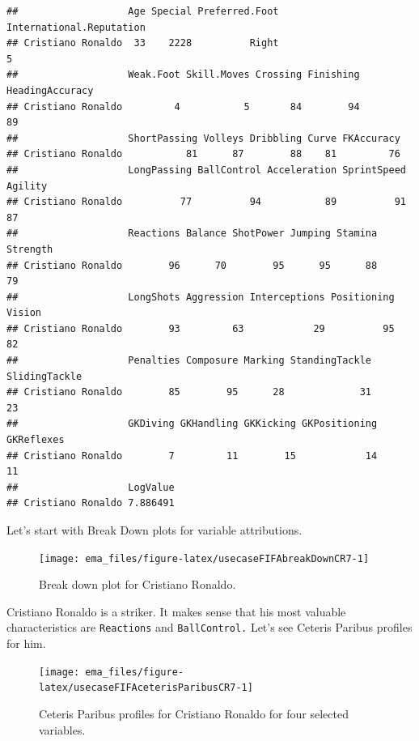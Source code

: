 \documentclass[]{krantz}
\begin{document}
\begin{verbatim}
##                   Age Special Preferred.Foot International.Reputation
## Cristiano Ronaldo  33    2228          Right                        5
##                   Weak.Foot Skill.Moves Crossing Finishing HeadingAccuracy
## Cristiano Ronaldo         4           5       84        94              89
##                   ShortPassing Volleys Dribbling Curve FKAccuracy
## Cristiano Ronaldo           81      87        88    81         76
##                   LongPassing BallControl Acceleration SprintSpeed Agility
## Cristiano Ronaldo          77          94           89          91      87
##                   Reactions Balance ShotPower Jumping Stamina Strength
## Cristiano Ronaldo        96      70        95      95      88       79
##                   LongShots Aggression Interceptions Positioning Vision
## Cristiano Ronaldo        93         63            29          95     82
##                   Penalties Composure Marking StandingTackle SlidingTackle
## Cristiano Ronaldo        85        95      28             31            23
##                   GKDiving GKHandling GKKicking GKPositioning GKReflexes
## Cristiano Ronaldo        7         11        15            14         11
##                   LogValue
## Cristiano Ronaldo 7.886491
\end{verbatim}

Let's start with Break Down plots for variable attributions.

\begin{figure}

{\centering \texttt{[image: ema\_files/figure-latex/usecaseFIFAbreakDownCR7-1]} 

}

\caption{Break down plot for Cristiano Ronaldo.}\label{fig:usecaseFIFAbreakDownCR7}
\end{figure}

Cristiano Ronaldo is a striker. It makes sense that his most valuable characteristics are \texttt{Reactions} and \texttt{BallControl.} Let's see Ceteris Paribus profiles for him.

\begin{figure}

{\centering \texttt{[image: ema\_files/figure-latex/usecaseFIFAceterisParibusCR7-1]} 

}

\caption{Ceteris Paribus profiles for Cristiano Ronaldo for four selected variables.}\label{fig:usecaseFIFAceterisParibusCR7}
\end{figure}


\end{document}
